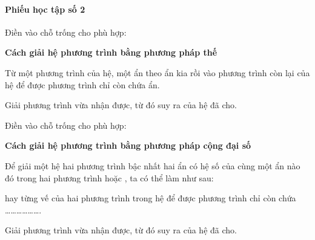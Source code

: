 \paragraph{Phiếu học tập số 2}

\begin{bt}
    Điền vào chỗ trống cho phù hợp:
    \begin{center}
        \textbf{Cách giải hệ phương trình bằng phương pháp thế}
    \end{center}
    \begin{cacbuoc}
        \item Từ một phương trình của hệ, \makebox[3cm]{\dotfill} một ẩn theo ẩn kia rồi \makebox[3cm]{\dotfill} vào phương trình còn lại của hệ để được phương trình chỉ còn chứa \makebox[3cm]{\dotfill} ẩn.
        \item Giải phương trình \makebox[3cm]{\dotfill} vừa nhận được, từ đó suy ra \makebox[3cm]{\dotfill} của hệ đã cho.
    \end{cacbuoc}
\end{bt}

\begin{bt}
    Điền vào chỗ trống cho phù hợp:
    \begin{center}
        \textbf{Cách giải hệ phương trình bằng phương pháp cộng đại số}
    \end{center}
    Để giải một hệ hai phương trình bậc nhất hai ẩn có hệ số của cùng một ẩn nào đó trong hai phương trình \makebox[3cm]{\dotfill} hoặc \makebox[3cm]{\dotfill}, ta có thể làm như sau:
    \begin{cacbuoc}
        \item \makebox[3cm]{\dotfill} hay \makebox[3cm]{\dotfill} từng vế của hai phương trình trong hệ để được phương trình chỉ còn chứa \dots\dots\dots\dots\dots\dots .
        \item Giải phương trình \makebox[3cm]{\dotfill} vừa nhận được, từ đó suy ra \makebox[3cm]{\dotfill} của hệ đã cho.
    \end{cacbuoc}
\end{bt}
